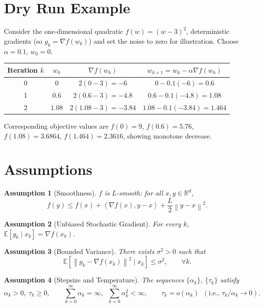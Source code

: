 \documentclass{article}
\newtheorem{assumption}{Assumption}
\newcommand{\E}{\mathbb{E}}
\newcommand{\R}{\mathbb{R}}
\newcommand{\norm}[1]{\left\|#1\right\|}
\newcommand{\inner}[2]{\left\langle #1,#2 \right\rangle}
\begin{document}
\section*{Dry Run Example}
Consider the one‑dimensional quadratic $f(w)=(w-3)^{2}$, deterministic gradients (so $g_{k}=\nabla f(w_{k})$) and set the noise to zero for illustration. Choose $\alpha=0.1$, $w_{0}=0$.

\begin{center}
\begin{tabular}{c|c|c|c}
Iteration $k$ & $w_{k}$ & $\nabla f(w_{k})$ & $w_{k+1}=w_{k}-\alpha\nabla f(w_{k})$ \\ \hline
0 & $0$ & $2(0-3)=-6$ & $0-0.1(-6)=0.6$ \\
1 & $0.6$ & $2(0.6-3)=-4.8$ & $0.6-0.1(-4.8)=1.08$ \\
2 & $1.08$ & $2(1.08-3)=-3.84$ & $1.08-0.1(-3.84)=1.464$ \\
\end{tabular}
\end{center}
Corresponding objective values are $f(0)=9$, $f(0.6)=5.76$, $f(1.08)=3.6864$, $f(1.464)=2.3616$, showing monotone decrease.

\newpage
\section*{Assumptions}
\begin{assumption}[Smoothness]\label{as:smooth}
$f$ is $L$‑smooth: for all $x,y\in\R^{d}$,
\[
f(y)\le f(x)+\inner{\nabla f(x)}{y-x}+\frac{L}{2}\norm{y-x}^{2}.
\tag{2}
\]
\end{assumption}
\begin{assumption}[Unbiased Stochastic Gradient]\label{as:unbiased}
For every $k$, $\E[g_{k}\mid x_{k}]=\nabla f(x_{k})$.
\end{assumption}
\begin{assumption}[Bounded Variance]\label{as:variance}
There exists $\sigma^{2}>0$ such that
\[
\E\!\left[\norm{g_{k}-\nabla f(x_{k})}^{2}\mid x_{k}\right]\le\sigma^{2},\qquad\forall k.
\tag{3}
\]
\end{assumption}
\begin{assumption}[Stepsize and Temperature]\label{as:schedule}
The sequences $\{\alpha_{k}\}$, $\{\tau_{k}\}$ satisfy
\[
\alpha_{k}>0,\;\tau_{k}\ge0,\qquad
\sum_{k=0}^{\infty}\alpha_{k}= \infty,\;\; 
\sum_{k=0}^{\infty}\alpha_{k}^{2}<\infty,\qquad
\tau_{k}=o(\alpha_{k})\;\;(\text{i.e., }\tau_{k}/\alpha_{k}\to0).
\tag{4}
\]
\end{assumption}
\end{document}
